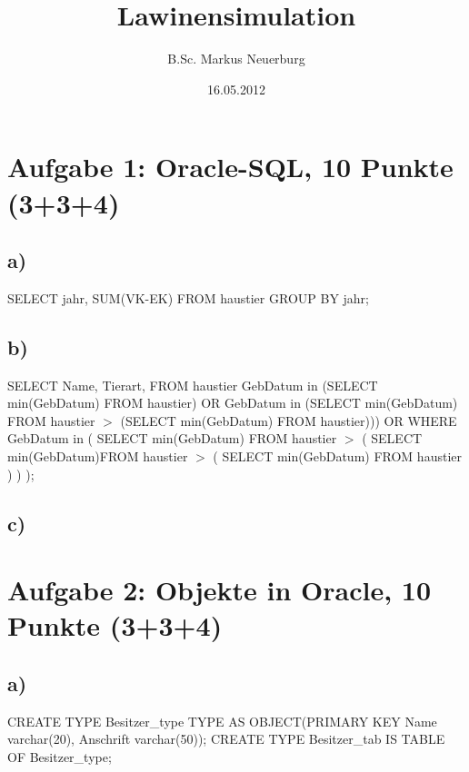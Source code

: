 \documentclass[12pt]{scrreprt}
\title{Lawinensimulation}
\author{B.Sc. Markus Neuerburg}
\date{16.05.2012}
\begin{document}
\section*{Aufgabe 1: Oracle-SQL, 10 Punkte (3+3+4)}
\subsection{a)}
SELECT jahr, SUM(VK-EK) FROM haustier GROUP BY jahr;

\subsection*{b)}
SELECT Name, Tierart, FROM haustier\newline
GebDatum in (SELECT min(GebDatum) FROM haustier) OR\newline
GebDatum in (SELECT min(GebDatum) FROM haustier $>$ (SELECT min(GebDatum) FROM haustier))) OR\newline
WHERE GebDatum in
(
\hspace*{5mm}SELECT min(GebDatum) FROM haustier $>$\newline
\hspace*{5mm}(\newline
\hspace*{10mm}SELECT min(GebDatum)FROM haustier $>$\newline
\hspace*{10mm}(\newline
\hspace*{15mm}SELECT min(GebDatum) FROM haustier\newline
\hspace*{10mm})\newline
\hspace*{5mm})\newline
);

\subsection*{c)}


\section*{Aufgabe 2: Objekte in Oracle, 10 Punkte (3+3+4)}
\subsection*{a)}
CREATE TYPE Besitzer\_type TYPE AS OBJECT(PRIMARY KEY Name varchar(20), Anschrift varchar(50));\newline
CREATE TYPE Besitzer\_tab IS TABLE OF Besitzer\_type;
\end{document}

